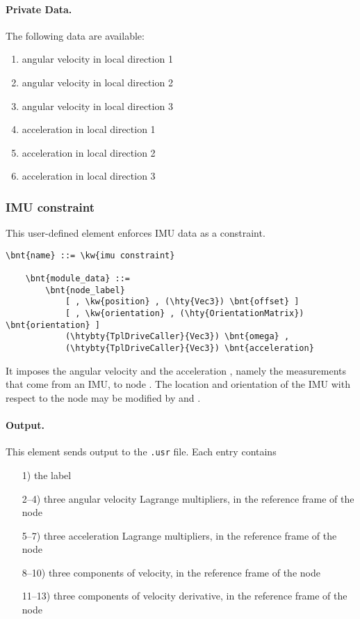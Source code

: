 \paragraph{Private Data.}
The following data are available:
\begin{enumerate}
\item {} angular velocity in local direction 1
\item {} angular velocity in local direction 2
\item {} angular velocity in local direction 3
\item {} acceleration in local direction 1
\item {} acceleration in local direction 2
\item {} acceleration in local direction 3
\end{enumerate}


\subsubsection{IMU constraint}
This user-defined element enforces IMU data as a constraint.
\begin{Verbatim}[commandchars=\\\{\}]
    \bnt{name} ::= \kw{imu constraint}

    \bnt{module_data} ::=
        \bnt{node_label}
            [ , \kw{position} , (\hty{Vec3}) \bnt{offset} ]
            [ , \kw{orientation} , (\hty{OrientationMatrix}) \bnt{orientation} ]
            (\htybty{TplDriveCaller}{Vec3}) \bnt{omega} ,
            (\htybty{TplDriveCaller}{Vec3}) \bnt{acceleration}
\end{Verbatim}
It imposes the angular velocity  and the acceleration ,
namely the measurements that come from an IMU, to node .
The location and orientation of the IMU with respect to the node may be modified
by  and .

\paragraph{Output.}
This element sends output to the \texttt{.usr} file.
Each entry contains
\begin{itemize}
\item[1)] the label
\item[2--4)] three angular velocity Lagrange multipliers, in the reference frame of the node
\item[5--7)] three acceleration Lagrange multipliers, in the reference frame of the node
\item[8--10)] three components of velocity, in the reference frame of the node
\item[11--13)] three components of velocity derivative, in the reference frame of the node
\end{itemize}





